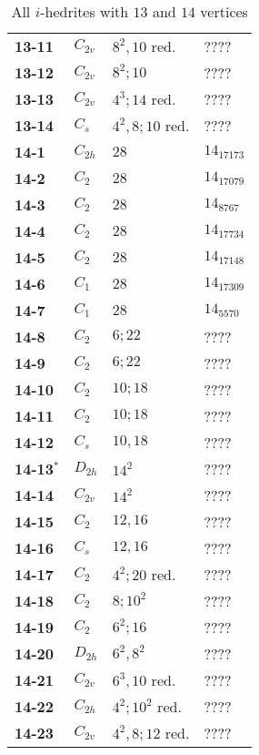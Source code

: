 \documentclass[12pt]{article}
\begin{document}
\begin{remark!!}
\begin{table}
\begin{center}
{\begin{minipage}[t]{7cm}
\begin{tabular}{||l|l|l|l||}
{\bf 13-11}	&$C_{2v}$	&$8^2, 10$ red.	&????\\
{\bf 13-12}	&$C_{2v}$	&$8^2; 10$	&????\\
{\bf 13-13}	&$C_{2v}$	&$4^3; 14$ red.	&????\\
{\bf 13-14}	&$C_s$	&$4^2,8;10$ red.	&????\\\hline
{\bf 14-1} 	&$C_{2h}$	&$28$		&$14_{17173}$\\
{\bf 14-2}	&$C_{2}$	&$28$		&$14_{17079}$\\
{\bf 14-3}	&$C_2$	&$28$		&$14_{8767}$\\
{\bf 14-4} 	&$C_2$	&$28$		&$14_{17734}$\\
{\bf 14-5} 	&$C_2$	&$28$		&$14_{17148}$\\
{\bf 14-6} 	&$C_1$	&$28$		&$14_{17309}$\\
{\bf 14-7} 	&$C_1$	&$28$		&$14_{5570}$\\
{\bf 14-8}	&$C_{2}$	&$6; 22$		&????\\
{\bf 14-9} 	&$C_2$	&$6; 22$		&????\\
{\bf 14-10}	&$C_2$	&$10; 18$		&????\\
{\bf 14-11}	&$C_2$	&$10; 18$		&????\\
{\bf 14-12}	&$C_s$	&$10, 18$		&????\\
{\bf 14-13${}^{*}$}	&$D_{2h}$	&$14^2$		&????\\
{\bf 14-14}	&$C_{2v}$	&$14^2$		&????\\
{\bf 14-15}	&$C_2$	&$12, 16$		&????\\
{\bf 14-16}	&$C_{s}$	&$12, 16$		&????\\
{\bf 14-17}	&$C_2$	&$4^2; 20$ red.	&????\\
{\bf 14-18}	&$C_2$	&$8; 10^2$	&????\\
{\bf 14-19}	&$C_2$	&$6^2; 16$	&????\\
{\bf 14-20}	&$D_{2h}$	&$6^2, 8^2$	&????\\
{\bf 14-21}	&$C_{2v}$	&$6^3, 10$ red.	&????\\
{\bf 14-22}	&$C_{2h}$	&$4^2; 10^2$ red.	&????\\
{\bf 14-23}	&$C_{2v}$	&$4^2, 8; 12$ red.	&????\\\hline
\end{tabular}
\end{minipage}
}
\end{center}
\caption{All $i$-hedrites with $13$ and $14$ vertices}
\label{tab:i-hedrite13_14}
\end{table}












\end{remark!!}
\end{document}
